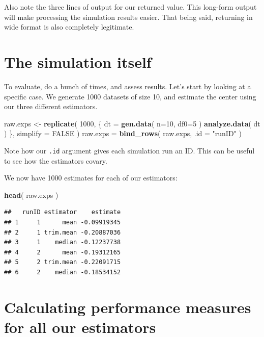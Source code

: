 \documentclass[
]{book}
\newenvironment{Shaded}{\begin{snugshade}}{\end{snugshade}}
\newcommand{\AttributeTok}[1]{\textcolor[rgb]{0.13,0.29,0.53}{#1}}
\newcommand{\ConstantTok}[1]{\textcolor[rgb]{0.56,0.35,0.01}{#1}}
\newcommand{\DecValTok}[1]{\textcolor[rgb]{0.00,0.00,0.81}{#1}}
\newcommand{\FunctionTok}[1]{\textcolor[rgb]{0.13,0.29,0.53}{\textbf{#1}}}
\newcommand{\NormalTok}[1]{#1}
\newcommand{\OtherTok}[1]{\textcolor[rgb]{0.56,0.35,0.01}{#1}}
\newcommand{\StringTok}[1]{\textcolor[rgb]{0.31,0.60,0.02}{#1}}
\begin{document}
Also note the three lines of output for our returned value.
This long-form output will make processing the simulation results easier.
That being said, returning in wide format is also completely legitimate.

\section{The simulation itself}\label{the-simulation-itself}

To evaluate, do a bunch of times, and assess results. Let's start by looking
at a specific case. We generate 1000 datasets of size 10, and estimate the
center using our three different estimators.

\begin{Shaded}
\begin{Highlighting}[]
\NormalTok{raw.exps }\OtherTok{\textless{}{-}} \FunctionTok{replicate}\NormalTok{( }\DecValTok{1000}\NormalTok{, \{}
\NormalTok{    dt }\OtherTok{=} \FunctionTok{gen.data}\NormalTok{( }\AttributeTok{n=}\DecValTok{10}\NormalTok{, }\AttributeTok{df0=}\DecValTok{5}\NormalTok{ )}
    \FunctionTok{analyze.data}\NormalTok{( dt )}
\NormalTok{\}, }\AttributeTok{simplify =} \ConstantTok{FALSE}\NormalTok{ )}
\NormalTok{raw.exps }\OtherTok{=} \FunctionTok{bind\_rows}\NormalTok{( raw.exps, }\AttributeTok{.id =} \StringTok{"runID"}\NormalTok{ )}
\end{Highlighting}
\end{Shaded}

Note how our \texttt{.id} argument gives each simulation run an ID. This can be
useful to see how the estimators covary.

We now have 1000 estimates for each of our estimators:

\begin{Shaded}
\begin{Highlighting}[]
\FunctionTok{head}\NormalTok{( raw.exps )}
\end{Highlighting}
\end{Shaded}

\begin{verbatim}
##   runID estimator    estimate
## 1     1      mean -0.09919345
## 2     1 trim.mean -0.20887036
## 3     1    median -0.12237738
## 4     2      mean -0.19312165
## 5     2 trim.mean -0.22091715
## 6     2    median -0.18534152
\end{verbatim}

\section{Calculating performance measures for all our estimators}\label{calculating-performance-measures-for-all-our-estimators}
\end{document}

